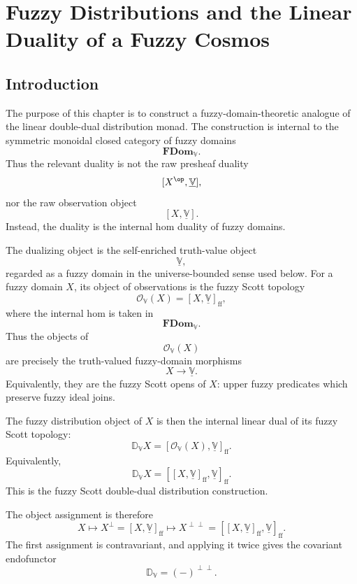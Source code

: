 \chapter{Fuzzy Distributions and the Linear Duality of a Fuzzy Cosmos}
\label{ch:fuzzy-distributions-linear-duality}

\section{Introduction}
\label{sec:fuzzy-distributions-introduction}

The purpose of this chapter is to construct a fuzzy-domain-theoretic analogue
of the linear double-dual distribution monad.  The construction is internal to
the symmetric monoidal closed category of fuzzy domains
\[
    \mathbf{FDom}_{\mathbb V}.
\]
Thus the relevant duality is not the raw presheaf duality
\[
    [X^{\op},\underline{\mathbb V}],
\]
nor the raw observation object
\[
    [X,\underline{\mathbb V}].
\]
Instead, the duality is the internal hom duality of fuzzy domains.

The dualizing object is the self-enriched truth-value object
\[
    \underline{\mathbb V},
\]
regarded as a fuzzy domain in the universe-bounded sense used below.  For a
fuzzy domain \(X\), its object of observations is the fuzzy Scott topology
\[
    \mathcal O_{\mathbb V}(X)
    =
    [X,\underline{\mathbb V}]_{\mathrm{ff}},
\]
where the internal hom is taken in
\[
    \mathbf{FDom}_{\mathbb V}.
\]
Thus the objects of
\[
    \mathcal O_{\mathbb V}(X)
\]
are precisely the truth-valued fuzzy-domain morphisms
\[
    X\to\underline{\mathbb V}.
\]
Equivalently, they are the fuzzy Scott opens of \(X\): upper fuzzy predicates
which preserve fuzzy ideal joins.

The fuzzy distribution object of \(X\) is then the internal linear dual of its
fuzzy Scott topology:
\[
    \mathbb D_{\mathbb V}X
    =
    [\mathcal O_{\mathbb V}(X),\underline{\mathbb V}]_{\mathrm{ff}}.
\]
Equivalently,
\[
    \mathbb D_{\mathbb V}X
    =
    [[X,\underline{\mathbb V}]_{\mathrm{ff}},
      \underline{\mathbb V}]_{\mathrm{ff}}.
\]
This is the fuzzy Scott double-dual distribution construction.

The object assignment is therefore
\[
    X
    \longmapsto
    X^{\perp}
    =
    [X,\underline{\mathbb V}]_{\mathrm{ff}}
    \longmapsto
    X^{\perp\perp}
    =
    [[X,\underline{\mathbb V}]_{\mathrm{ff}},
      \underline{\mathbb V}]_{\mathrm{ff}}.
\]
The first assignment is contravariant, and applying it twice gives the
covariant endofunctor
\[
    \mathbb D_{\mathbb V}
    =
    (-)^{\perp\perp}.
\]

